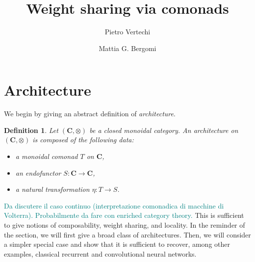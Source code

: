 \documentclass[12pt]{article}
\title{Weight sharing via comonads}
\author{
    Pietro Vertechi \and Mattia G. Bergomi
}
\date{}
\newtheorem{definition}{Definition}
\newcommand{\pietro}[1]{\textcolor{teal}{#1}}
\newcommand{\Obj}{{\textnormal{Obj}}}
\newcommand{\Cat}{{\mathbf{C}}}
\newcommand{\LCat}{{\mathbf{L}}}
\begin{document}
\maketitle
\begin{abstract}
\end{abstract}

\section{Architecture}

We begin by giving an abstract definition of {\em architecture}.

\begin{definition}\label{def:architecture}
    Let $(\Cat, \otimes)$ be a closed monoidal category.
    An {\em architecture} on $(\Cat, \otimes)$ is composed of the following data:
    \begin{itemize}
        \item a monoidal comonad $T$ on $\Cat$,
        \item an endofunctor $S \colon \Cat \rightarrow \Cat$,
        \item a natural transformation $\eta \colon T \rightarrow S$.
    \end{itemize}
\end{definition}



\pietro{Da discutere il caso continuo (interpretazione comonadica di macchine di Volterra). Probabilmente da fare con enriched category theory.}
This is sufficient to give notions of composability, weight sharing, and locality. In the reminder of the section, we will first give a broad class of architectures. Then, we will consider a simpler special case and show that it is sufficient to recover, among other examples, classical recurrent and convolutional neural networks.
\end{document}
